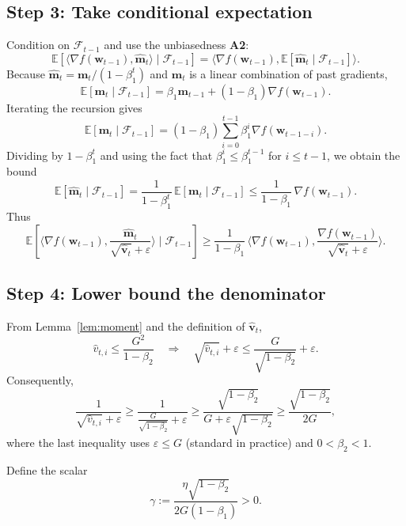 \documentclass{article}
\newcommand{\E}{\mathbb{E}}
\begin{document}
\subsection*{Step 3: Take conditional expectation}
Condition on $\mathcal{F}_{t-1}$ and use the unbiasedness \textbf{A2}:
\[
    \E\!\left[\langle\nabla f(\bm w_{t-1}),\hat{\bm m}_{t}\rangle\mid\mathcal{F}_{t-1}\right]
    =\langle\nabla f(\bm w_{t-1}),\E[\hat{\bm m}_{t}\mid\mathcal{F}_{t-1}]\rangle .
\]
Because $\hat{\bm m}_{t}= \bm m_{t}/(1-\beta_{1}^{t})$ and $\bm m_{t}$ is a linear combination of past gradients,
\[
    \E[\bm m_{t}\mid\mathcal{F}_{t-1}]
    =\beta_{1}\bm m_{t-1}+(1-\beta_{1})\nabla f(\bm w_{t-1}).
\]
Iterating the recursion gives
\[
    \E[\bm m_{t}\mid\mathcal{F}_{t-1}]
    = (1-\beta_{1})\sum_{i=0}^{t-1}\beta_{1}^{i}\nabla f(\bm w_{t-1-i}).
\]
Dividing by $1-\beta_{1}^{t}$ and using the fact that $\beta_{1}^{i}\le\beta_{1}^{t-1}$ for $i\le t-1$, we obtain the bound
\[
    \E[\hat{\bm m}_{t}\mid\mathcal{F}_{t-1}]
    = \frac{1}{1-\beta_{1}^{t}}\,\E[\bm m_{t}\mid\mathcal{F}_{t-1}]
    \le \frac{1}{1-\beta_{1}}\,\nabla f(\bm w_{t-1}).
\tag{10}
\]
Thus
\[
    \E\!\left[\Big\langle\nabla f(\bm w_{t-1}),
         \frac{\hat{\bm m}_{t}}{\sqrt{\hat{\bm v}_{t}}+\varepsilon}
    \Big\rangle\mid\mathcal{F}_{t-1}\right]
    \ge \frac{1}{1-\beta_{1}}\,
    \Big\langle\nabla f(\bm w_{t-1}),\frac{\nabla f(\bm w_{t-1})}
          {\sqrt{\hat{\bm v}_{t}}+\varepsilon}\Big\rangle .
\tag{11}
\]

\subsection*{Step 4: Lower bound the denominator}
From Lemma~\ref{lem:moment} and the definition of $\hat{\bm v}_{t}$,
\[
    \hat{v}_{t,i}\le \frac{G^{2}}{1-\beta_{2}} \quad\Longrightarrow\quad
    \sqrt{\hat{v}_{t,i}}+\varepsilon\le
    \frac{G}{\sqrt{1-\beta_{2}}}+\varepsilon.
\tag{12}
\]
Consequently,
\[
    \frac{1}{\sqrt{\hat{v}_{t,i}}+\varepsilon}\ge
    \frac{1}{\frac{G}{\sqrt{1-\beta_{2}}}+\varepsilon}
    \ge \frac{\sqrt{1-\beta_{2}}}{G+ \varepsilon\sqrt{1-\beta_{2}}}
    \ge \frac{\sqrt{1-\beta_{2}}}{2G},
\tag{13}
\]
where the last inequality uses $\varepsilon\le G$ (standard in practice) and $0<\beta_{2}<1$.

Define the scalar
\[
    \gamma:=\frac{\eta\sqrt{1-\beta_{2}}}{2G(1-\beta_{1})}>0.
\tag{14}
\]
\end{document}
